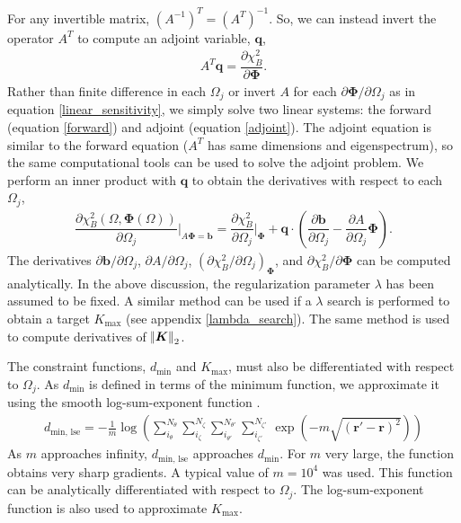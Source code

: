 \documentclass[aps,unsortedaddress]{revtex4-1}
\newcommand{\partder}[2]{\dfrac{\partial  #1}{\partial  #2}}
\begin{document}
For any invertible matrix, $\left( A^{-1} \right)^T = \left( A^{T} \right)^{-1}$. So, we can instead invert the operator $A^T$ to compute an adjoint variable, $\bm{q}$,
\begin{gather}
A^T \bm{q} = \partder{\chi^2_B}{\bm{\Phi}}.
\label{adjoint}
\end{gather}
Rather than finite difference in each $\Omega_j$ or invert $A$ for each $\partial \bm{\Phi}/\partial \Omega_j$ as in equation \ref{linear_sensitivity}, we simply solve two linear systems: the forward (equation \ref{forward}) and adjoint (equation \ref{adjoint}). The adjoint equation is similar to the forward equation ($A^T$ has same dimensions and eigenspectrum), so the same computational tools can be used to solve the adjoint problem. We perform an inner product with $\bm{q}$ to obtain the derivatives with respect to each $\Omega_j$,
\begin{gather}
\partder{\chi^2_B(\Omega, \bm{\Phi}(\Omega))}{\Omega_j} \bigg \rvert_{A \bm{\Phi} = \bm{b}} = \partder{\chi^2_B}{\Omega_j} \bigg \rvert_{\bm{\Phi}} + \bm{q} \cdot \left( \partder{\bm{b}}{\Omega_j} - \partder{A}{\Omega_j} \bm{\Phi} \right).
\label{adjointsensitivity}
\end{gather}
The derivatives $\partial \bm{b}/\partial \Omega_j$, $\partial A/\partial \Omega_j$, $\left( \partial \chi^2_B/\partial \Omega_j \right)_{\bm{\Phi}}$, and $\partial \chi^2_B/\partial \bm{\Phi}$ can be computed analytically. In the above discussion, the regularization parameter $\lambda$ has been assumed to be fixed. A similar method can be used if a $\lambda$ search is performed to obtain a target $K_{\text{max}}$ (see appendix \ref{lambda_search}). The same method is used to compute derivatives of $\norm{\bm{K}}_2$. 

The constraint functions, $d_{\text{min}}$ and $K_{\text{max}}$, must also be differentiated with respect to $\Omega_j$. As $d_{\text{min}}$ is defined in terms of the minimum function, we approximate it using the smooth log-sum-exponent function \cite{Boyd2004}.
\begin{gather}
d_{\text{min, lse}} = - \frac{1}{m} \log \left( \sum_{i_{\theta}}^{N_{\theta}} \sum_{i_{\zeta}}^{N_{\zeta}} \sum_{i_{\theta'}}^{N_{\theta'}} \sum_{i_{\zeta'}}^{N_{\zeta'}} \, \exp \left( - m \sqrt{(\bm{r}' - \bm{r})^2} \right) \right)
\label{lse_d}
\end{gather}
As $m$ approaches infinity, $d_{\text{min, lse}}$ approaches $d_{\text{min}}$. For $m$ very large, the function obtains very sharp gradients. A typical value of $m = 10^4$ was used. This function can be analytically differentiated with respect to $\Omega_j$. The log-sum-exponent function is also used to approximate $K_{\text{max}}$. 
\end{document}
